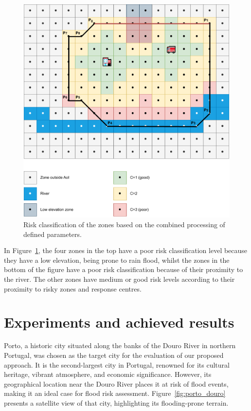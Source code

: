 \begin{refsection}
\begin{figure}[ht!]
    \centering
    \includegraphics[width=0.85\linewidth]{Chapters/6-Flood/figs/zones_and_pois_classified.pdf}
    \caption{Risk classification of the zones based on the combined processing of defined parameters.}
    \label{fig:zones_and_pois_classified}
\end{figure}

In Figure~\ref{fig:zones_and_pois_classified}, the four zones in the top have a poor risk classification level because they have a low elevation, being prone to rain flood, whilst the zones in the bottom of the figure have a poor risk classification because of their proximity to the river. The other zones have medium or good risk levels according to their proximity to risky zones and response centres.

\section{Experiments and achieved results}
\label{sec:simulation}

Porto, a historic city situated along the banks of the Douro River in northern Portugal, was chosen as the target city for the evaluation of our proposed approach. It is the second-largest city in Portugal, renowned for its cultural heritage, vibrant atmosphere, and economic significance. However, its geographical location near the Douro River places it at risk of flood events, making it an ideal case for flood risk assessment. Figure~\ref{fig:porto_douro} presents a satellite view of that city, highlighting its flooding-prone terrain.


\end{refsection}
